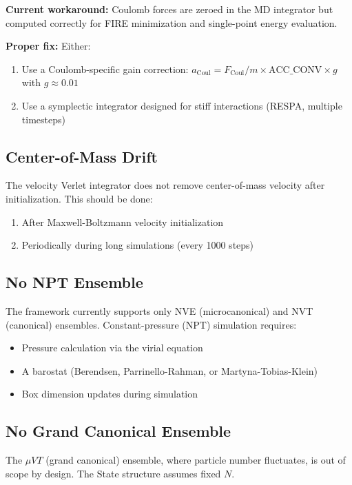 \documentclass[11pt]{article}
\begin{document}
\textbf{Current workaround:} Coulomb forces are zeroed in the MD integrator but computed correctly for FIRE minimization and single-point energy evaluation.

\textbf{Proper fix:} Either:
\begin{enumerate}
\item Use a Coulomb-specific gain correction: $a_{\text{Coul}} = F_{\text{Coul}} / m \times \text{ACC\_CONV} \times g$ with $g \approx 0.01$
\item Use a symplectic integrator designed for stiff interactions (RESPA, multiple timesteps)
\end{enumerate}

\subsection{Center-of-Mass Drift}

The velocity Verlet integrator does not remove center-of-mass velocity after initialization. This should be done:
\begin{enumerate}
\item After Maxwell-Boltzmann velocity initialization
\item Periodically during long simulations (every 1000 steps)
\end{enumerate}

\subsection{No NPT Ensemble}

The framework currently supports only NVE (microcanonical) and NVT (canonical) ensembles. Constant-pressure (NPT) simulation requires:
\begin{itemize}
\item Pressure calculation via the virial equation
\item A barostat (Berendsen, Parrinello-Rahman, or Martyna-Tobias-Klein)
\item Box dimension updates during simulation
\end{itemize}

\subsection{No Grand Canonical Ensemble}

The $\mu VT$ (grand canonical) ensemble, where particle number fluctuates, is out of scope by design. The State structure assumes fixed $N$.
\end{document}
